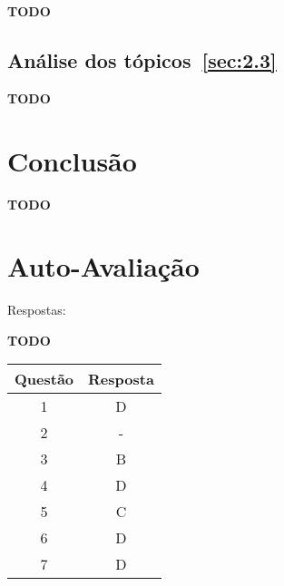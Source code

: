 \documentclass[12pt]{article}
\begin{document}
\textbf{TODO}

\subsection{Análise dos tópicos~\ref{sec:2.3}}\label{sec:analise2.4}

\textbf{TODO}

\section{Conclusão}\label{sec:Conclusao}

\textbf{TODO}

\nocite{*}



\newpage
\section*{Auto-Avaliação}

Respostas:

\textbf{TODO}

\begin{table}[H]
      \begin{tabular}{|c|c|} \hline
      \textbf{Questão} & \textbf{Resposta}\\
      \hline
      1  & D \\ \hline
      2  & - \\ \hline
      3  & B \\ \hline
      4  & D \\ \hline
      5  & C \\ \hline
      6  & D \\ \hline
      7  & D \\ \hline
      \end{tabular}
\end{table}
\end{document}
